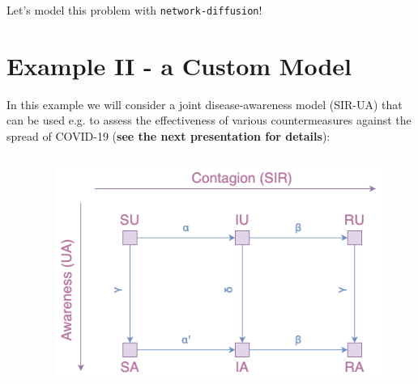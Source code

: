 \documentclass{beamer}
\begin{document}
\begin{frame}{\secname}
    \begin{center}
        \large Let's model this problem with \lstinline[style=py]{network-diffusion}!
    \end{center}
\end{frame}

\section{Example II - a Custom Model}

\begin{frame}{\secname}
    In this example we will consider a joint disease-awareness model (SIR-UA) that can be used e.g.
    to assess the effectiveness of various countermeasures against the spread of COVID-19 
    (\textbf{see the next presentation for details}):
    \begin{columns}[T]
        \captionsetup{font=scriptsize}
        \begin{column}{.5\textwidth}
            \begin{table}
            \centering
            \caption{Transition weights with explanation.}
            \end{table}
        \end{column}
        \begin{column}{0.5\textwidth}
        \begin{figure}
            \centering
            \includegraphics[width=\textwidth]{figures/sir_ua.png}

\end{figure}
\end{column}
\end{columns}
\end{frame}
\end{document}
